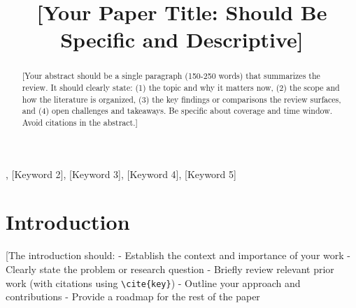 \documentclass[conference]{IEEEtran}
\begin{document}
\title{[Your Paper Title: Should Be Specific and Descriptive]}

\author{
}

\maketitle

\begin{IEEEkeywords}
[Keyword 1], [Keyword 2], [Keyword 3], [Keyword 4], [Keyword 5]
\end{IEEEkeywords}

\begin{abstract}
[Your abstract should be a single paragraph (150-250 words) that summarizes the review. It should clearly state:
(1) the topic and why it matters now,
(2) the scope and how the literature is organized,
(3) the key findings or comparisons the review surfaces, and
(4) open challenges and takeaways.
Be specific about coverage and time window. Avoid citations in the abstract.]
\end{abstract}

\section{Introduction}
[The introduction should:
- Establish the context and importance of your work
- Clearly state the problem or research question
- Briefly review relevant prior work (with citations using \verb|\cite{key}|)
- Outline your approach and contributions
- Provide a roadmap for the rest of the paper
\end{document}
